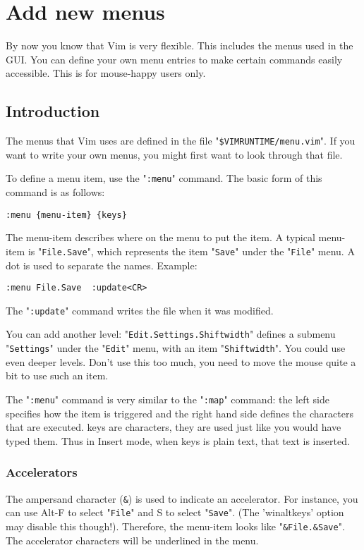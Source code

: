 \section{Add new menus}
By now you know that Vim is very flexible.
This includes the menus used in the GUI.
You can define your own menu entries to make certain commands easily accessible.
This is for mouse-happy users only.
\subsection{Introduction}
The menus that Vim uses are defined in the file "\verb!$VIMRUNTIME/menu.vim!".
If you want to write your own menus, you might first want to look through that file.

To define a menu item, use the "\verb!:menu!" command.
The basic form of this command is as follows:

\begin{Verbatim}[samepage=true]
 :menu {menu-item} {keys}
\end{Verbatim}

The {menu-item} describes where on the menu to put the item.
A typical {menu-item} is "\verb!File.Save!", which represents the item "\verb!Save!" under the "\verb!File!" menu.
A dot is used to separate the names.
Example:

\begin{Verbatim}[samepage=true]
 :menu File.Save  :update<CR>
\end{Verbatim}

The "\verb!:update!" command writes the file when it was modified.

You can add another level: "\verb!Edit.Settings.Shiftwidth!" defines a submenu "\verb!Settings!" under the "\verb!Edit!" menu, with an item "\verb!Shiftwidth!".
You could use even deeper levels.
Don't use this too much, you need to move the mouse quite a bit to use such an item.

The "\verb!:menu!" command is very similar to the "\verb!:map!" command: the left side specifies how the item is triggered and the right hand side defines the characters that are executed.
{keys} are characters, they are used just like you would have typed them.
Thus in Insert mode, when {keys} is plain text, that text is inserted.

\subsubsection{Accelerators}
The ampersand character (\verb!&!) is used to indicate an accelerator.
For instance, you can use Alt-F to select "\verb!File!" and S to select "\verb!Save!".
(The 'winaltkeys' option may disable this though!).
Therefore, the {menu-item} looks like "\verb!&File.&Save!".
The accelerator characters will be underlined in the menu.

